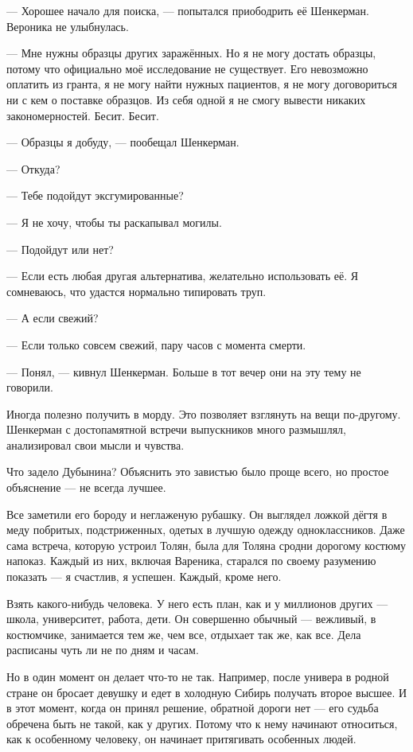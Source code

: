 --- Хорошее начало для поиска, --- попытался приободрить её Шенкерман.
Вероника не улыбнулась.

--- Мне нужны образцы других заражённых.
Но я не могу достать образцы, потому что официально моё исследование не существует.
Его невозможно оплатить из гранта, я не могу найти нужных пациентов, я не могу договориться ни с кем о поставке образцов.
Из себя одной я не смогу вывести никаких закономерностей.
Бесит.
Бесит.

--- Образцы я добуду, --- пообещал Шенкерман.

--- Откуда?

--- Тебе подойдут эксгумированные?

--- Я не хочу, чтобы ты раскапывал могилы.

--- Подойдут или нет?

--- Если есть любая другая альтернатива, желательно использовать её.
Я сомневаюсь, что удастся нормально типировать труп.

--- А если свежий?

--- Если только совсем свежий, пару часов с момента смерти.

--- Понял, --- кивнул Шенкерман.
Больше в тот вечер они на эту тему не говорили.

\asterism

Иногда полезно получить в морду.
Это позволяет взглянуть на вещи по-другому.
Шенкерман с достопамятной встречи выпускников много размышлял, анализировал свои мысли и чувства.

Что задело Дубынина?
Объяснить это завистью было проще всего, но простое объяснение --- не всегда лучшее.

Все заметили его бороду и неглаженую рубашку.
Он выглядел ложкой дёгтя в меду побритых, подстриженных, одетых в лучшую одежду одноклассников.
Даже сама встреча, которую устроил Толян, была для Толяна сродни дорогому костюму напоказ.
Каждый из них, включая Вареника, старался по своему разумению показать --- я счастлив, я успешен.
Каждый, кроме него.

\textspace

Взять какого-нибудь человека.
У него есть план, как и у миллионов других --- школа, университет, работа, дети.
Он совершенно обычный --- вежливый, в костюмчике, занимается тем же, чем все, отдыхает так же, как все.
Дела расписаны чуть ли не по дням и часам.

Но в один момент он делает что-то не так.
Например, после универа в родной стране он бросает девушку и едет в холодную Сибирь получать второе высшее.
И в этот момент, когда он принял решение, обратной дороги нет --- его судьба обречена быть не такой, как у других.
Потому что к нему начинают относиться, как к особенному человеку, он начинает притягивать особенных людей.

